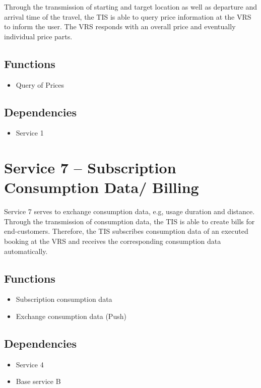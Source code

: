 Through the transmission of starting and target location as well as departure and arrival time of the travel, the TIS is able to query price information at the VRS to inform the user. The VRS responds with an overall price and eventually individual price parts.

\subsection*{Functions}
\begin{itemize}
\item Query of Prices
\end{itemize}

\subsection*{Dependencies}
\begin{itemize}
\item Service 1
\end{itemize}


\section{Service 7 -- Subscription Consumption Data/ Billing}
Service 7 serves to exchange consumption data, e.g, usage duration and distance. Through the transmission of consumption data, the TIS is able to create bills for end-customers. Therefore, the TIS subscribes consumption data of an executed booking at the VRS and receives the corresponding consumption data automatically. 

\subsection*{Functions}
\begin{itemize}
\item Subscription consumption data 
\item Exchange consumption data (Push)
\end{itemize}

\subsection*{Dependencies}
\begin{itemize}
\item Service 4
\item Base service B
\end{itemize}

